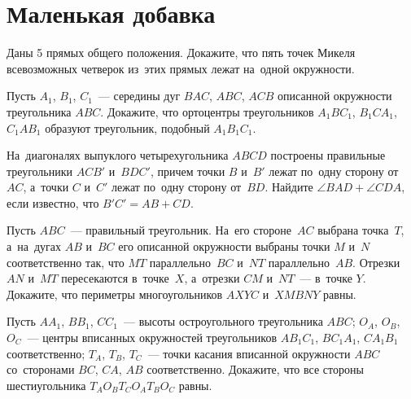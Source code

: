 
\section*{Маленькая добавка}


\begin{problems}

\item
Даны 5 прямых общего положения.
Докажите, что пять точек Микеля всевозможных четверок из~этих прямых лежат
на~одной окружности.

\item
Пусть $A_1$, $B_1$, $C_1$~--- середины дуг $BAC$, $ABC$, $ACB$ описанной
окружности треугольника $ABC$.
Докажите, что ортоцентры треугольников $A_1 B C_1$, $B_1 C A_1$, $C_1 A B_1$
образуют треугольник, подобный $A_1 B_1 C_1$.

\item
На~диагоналях выпуклого четырехугольника $ABCD$ построены правильные
треугольники $ACB'$ и~$BDC'$, причем точки $B$ и~$B'$ лежат по~одну сторону
от~$AC$, а~точки $C$ и~$C'$ лежат по~одну сторону от~$BD$.
Найдите $\angle BAD + \angle CDA$, если известно, что $B'C'= AB + CD$.

\item
Пусть $ABC$~--- правильный треугольник.
На~его стороне~$AC$ выбрана точка~$T$, а~на~дугах $AB$ и~$BC$ его описанной
окружности выбраны точки $M$ и~$N$ соответственно так, что
$MT$ параллельно~$BC$ и~$NT$ параллельно~$AB$.
Отрезки $AN$ и~$MT$ пересекаются в~точке~$X$, а~отрезки $CM$ и~$NT$~---
в~точке $Y$.
Докажите, что периметры многоугольников $AXYC$ и~$XMBNY$ равны.

\item
Пусть $A A_1$, $B B_1$, $C C_1$~--- высоты остроугольного треугольника $ABC$;
$O_A$, $O_B$, $O_C$~--- центры вписанных окружностей треугольников
$A B_1 C_1$, $B C_1 A_1$, $C A_1 B_1$ соответственно;
$T_A$, $T_B$, $T_C$~--- точки касания вписанной окружности $ABC$ со~сторонами
$BC$, $CA$, $AB$ соответственно.
Докажите, что все стороны шестиугольника $T_A O_B T_C O_A T_B O_C$ равны.

\end{problems}


